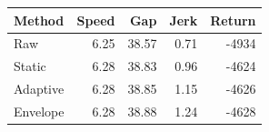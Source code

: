 \begin{tabular}{lrrrr}
\toprule
Method & Speed & Gap & Jerk & Return \\
\midrule
Raw & 6.25 & 38.57 & 0.71 & -4934 \\
Static & 6.28 & 38.83 & 0.96 & -4624 \\
Adaptive & 6.28 & 38.85 & 1.15 & -4626 \\
Envelope & 6.28 & 38.88 & 1.24 & -4628 \\
\bottomrule
\end{tabular}
